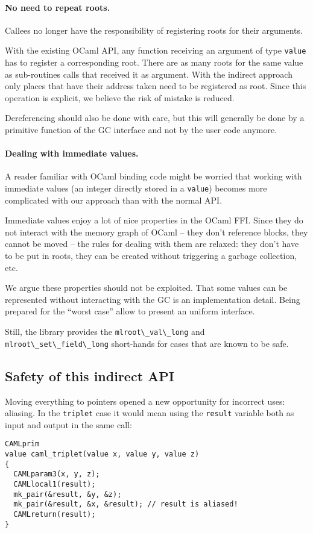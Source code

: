 \documentclass[a4paper]{easychair}
\newcommand{\cpp}[1]{\lstinline[style=C++]{#1}}
\begin{document}
\paragraph{No need to repeat roots.}

Callees no longer have the responsibility of registering roots for their arguments.

With the existing OCaml API, any function receiving an argument of type
\cpp{value} has to register a corresponding root. There are as many
roots for the same value as sub-routines calls that received it as
argument.  With the indirect approach only places that have their
address taken need to be registered as root. Since this operation is explicit, we believe the risk of mistake is reduced.

Dereferencing should also be done with care, but this will generally
be done by a primitive function of the GC interface and not by the user code anymore.

\paragraph{Dealing with immediate values.}

A reader familiar with OCaml binding code might be worried that working
with immediate values (an integer directly stored in a \cpp{value})
becomes more complicated with our approach than with the normal API.

Immediate values enjoy a lot of nice properties in the OCaml FFI. Since
they do not interact with the memory graph of OCaml -- they don't reference
blocks, they cannot be moved -- the rules for dealing with them are relaxed:
they don't have to be put in roots, they can be created without triggering a
garbage collection, etc.

We argue these properties should not be exploited. That some values can be
represented without interacting with the GC is an implementation detail. Being
prepared for the ``worst case'' allow to present an uniform interface.

Still, the library provides the \cpp{mlroot\_val\_long} and
\cpp{mlroot\_set\_field\_long} short-hands for cases that are known to be
safe.

\subsection{Safety of this indirect API}

Moving everything to pointers opened a new opportunity for incorrect
uses: aliasing. In the \cpp{triplet} case it would mean using the
\cpp{result} variable both as input and output in the same call:
%
\begin{lstlisting}[style=C++]
CAMLprim
value caml_triplet(value x, value y, value z)
{
  CAMLparam3(x, y, z);
  CAMLlocal1(result);
  mk_pair(&result, &y, &z);
  mk_pair(&result, &x, &result); // result is aliased!
  CAMLreturn(result);
}
\end{lstlisting}
\end{document}
